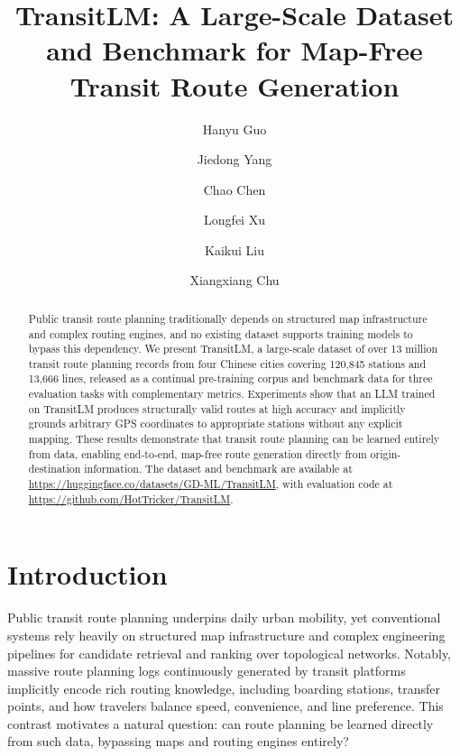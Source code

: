\documentclass{llmxive}
\title{TransitLM: A Large-Scale Dataset and Benchmark for Map-Free Transit Route Generation}
\author{Hanyu Guo \and Jiedong Yang \and Chao Chen \and Longfei Xu \and Kaikui Liu \and Xiangxiang Chu}
\providecommand{\thefootnote}{*}
\begin{document}
\maketitle
\begin{abstract}
Public transit route planning traditionally depends on structured map infrastructure and complex routing engines, and no existing dataset supports training models to bypass this dependency. We present TransitLM, a large-scale dataset of over 13 million transit route planning records from four Chinese cities covering 120,845 stations and 13,666 lines, released as a continual pre-training corpus and benchmark data for three evaluation tasks with complementary metrics. Experiments show that an LLM trained on TransitLM produces structurally valid routes at high accuracy and implicitly grounds arbitrary GPS coordinates to appropriate stations without any explicit mapping. These results demonstrate that transit route planning can be learned entirely from data, enabling end-to-end, map-free route generation directly from origin-destination information. The dataset and benchmark are available at \url{https://huggingface.co/datasets/GD-ML/TransitLM}, with evaluation code at \url{https://github.com/HotTricker/TransitLM}.
\end{abstract}
\renewcommand{\thefootnote}{*}





\section{Introduction}
\label{sec:introduction}
Public transit route planning underpins daily urban mobility, yet conventional systems rely heavily on structured map infrastructure and complex engineering pipelines for candidate retrieval and ranking over topological networks. Notably, massive route planning logs continuously generated by transit platforms implicitly encode rich routing knowledge, including boarding stations, transfer points, and how travelers balance speed, convenience, and line preference. This contrast motivates a natural question: can route planning be learned directly from such data, bypassing maps and routing engines entirely?
\end{document}
